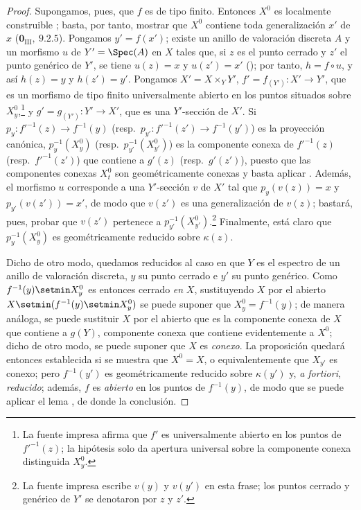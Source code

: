 \begin{proof}
Supongamos, pues, que $f$ es de tipo finito.
Entonces $X^0$ es localmente construible ; basta, por tanto, mostrar que $X^0$ contiene toda generalización $x'$ de $x$ ($\mathbf{0}_{\mathrm{III}},~9.2.5$).
Pongamos $y'=f(x')$; existe un anillo de valoración discreta $A$ y un morfismo $u$ de $Y'=\Spec(A)$ en $X$ tales que, si $z$ es el punto cerrado y $z'$ el punto genérico de $Y'$, se tiene $u(z)=x$ y $u(z')=x'$ (); por tanto, $h=f\circ u$, y así $h(z)=y$ y $h(z')=y'$.
Pongamos $X'=X\times_Y Y'$, $f'=f_{(Y')}:X'\to Y'$, que es un morfismo de tipo finito universalmente abierto en los puntos situados sobre $X_y^0$,\footnote{La fuente impresa afirma que $f'$ es universalmente abierto en los puntos de $f'^{-1}(z)$; la hipótesis solo da apertura universal sobre la componente conexa distinguida $X_y^0$.} y $g'=g_{(Y')}:Y'\to X'$, que es una $Y'$-sección de $X'$.
Si $p_y:f'^{-1}(z)\to f^{-1}(y)$ (resp.\ $p_{y'}:f'^{-1}(z')\to f^{-1}(y')$) es la proyección canónica, $p_y^{-1}(X_y^0)$ (resp.\ $p_{y'}^{-1}(X_{y'}^0)$) es la componente conexa de $f'^{-1}(z)$ (resp.\ $f'^{-1}(z')$) que contiene a $g'(z)$ (resp.\ $g'(z')$), puesto que las componentes conexas $X_t^0$ son geométricamente conexas  y basta aplicar .
Además, el morfismo $u$ corresponde a una $Y'$-sección $v$ de $X'$ tal que $p_y(v(z))=x$ y $p_{y'}(v(z'))=x'$, de modo que $v(z')$ es una generalización de $v(z)$; bastará, pues, probar que $v(z')$ pertenece a $p_{y'}^{-1}(X_{y'}^0)$.\footnote{La fuente impresa escribe $v(y)$ y $v(y')$ en esta frase; los puntos cerrado y genérico de $Y'$ se denotaron por $z$ y $z'$.}
Finalmente, está claro que $p_y^{-1}(X_y^0)$ es geométricamente reducido sobre $\kappa(z)$.

Dicho de otro modo, quedamos reducidos al caso en que $Y$ es el espectro de un anillo de valoración discreta, $y$ su punto cerrado e $y'$ su punto genérico.
Como $f^{-1}(y)\setmin X_y^0$ es entonces cerrado \emph{en} $X$, sustituyendo $X$ por el abierto $X\setmin(f^{-1}(y)\setmin X_y^0)$ se puede suponer que $X_y^0=f^{-1}(y)$; de manera análoga, se puede sustituir $X$ por el abierto que es la componente conexa de $X$ que contiene a $g(Y)$, componente conexa que contiene evidentemente a $X^0$; dicho de otro modo, se puede suponer que $X$ es \emph{conexo}.
La proposición quedará entonces establecida si se muestra que $X^0=X$, o equivalentemente que $X_{y'}$ es conexo; pero $f^{-1}(y')$ es geométricamente reducido sobre $\kappa(y')$ y, \emph{a fortiori}, \emph{reducido}; además, $f$ es \emph{abierto} en los puntos de $f^{-1}(y)$, de modo que se puede aplicar el lema , de donde la conclusión.
\end{proof}


